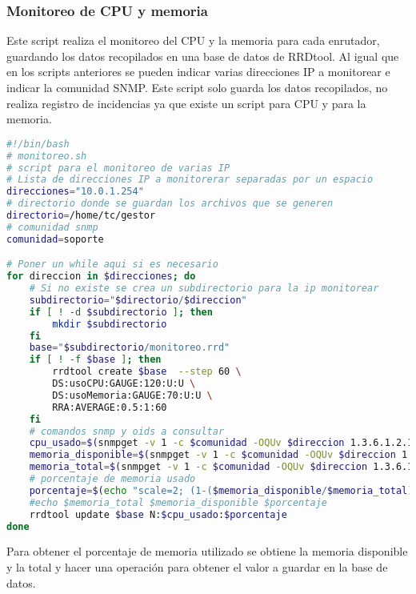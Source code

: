 \documentclass[a4paper,12pt]{article}
\begin{document}
\subsubsection{Monitoreo de CPU y memoria}
Este script realiza el monitoreo del CPU y la memoria para cada enrutador, guardando los datos recopilados en una base de datos de RRDtool. Al igual que en los scripts anteriores se pueden indicar varias direcciones IP a monitorear e indicar la comunidad SNMP. Este script solo guarda los datos recopilados, no realiza registro de incidencias ya que existe un script para CPU y para la memoria. 
\begin{lstlisting}[language=bash]
 #!/bin/bash
# monitoreo.sh
# script para el monitoreo de varias IP
# Lista de direcciones IP a monitorerar separadas por un espacio
direcciones="10.0.1.254"
# directorio donde se guardan los archivos que se generen
directorio=/home/tc/gestor
# comunidad snmp
comunidad=soporte

# Poner un while aqui si es necesario
for direccion in $direcciones; do
    # Si no existe se crea un subdirectorio para la ip monitorear
    subdirectorio="$directorio/$direccion"
    if [ ! -d $subdirectorio ]; then
        mkdir $subdirectorio
    fi
    base="$subdirectorio/monitoreo.rrd"
    if [ ! -f $base ]; then
        rrdtool create $base  --step 60 \
        DS:usoCPU:GAUGE:120:U:U \
        DS:usoMemoria:GAUGE:70:U:U \
        RRA:AVERAGE:0.5:1:60
    fi
    # comandos snmp y oids a consultar
    cpu_usado=$(snmpget -v 1 -c $comunidad -OQUv $direccion 1.3.6.1.2.1.25.3.3.1.2.768)
    memoria_disponible=$(snmpget -v 1 -c $comunidad -OQUv $direccion 1.3.6.1.4.1.2021.4.6.0)
    memoria_total=$(snmpget -v 1 -c $comunidad -OQUv $direccion 1.3.6.1.4.1.2021.4.5.0)
    # porcentaje de memoria usado
    porcentaje=$(echo "scale=2; (1-($memoria_disponible/$memoria_total))*100" | bc -l)
    #echo $memoria_total $memoria_disponible $porcentaje
    rrdtool update $base N:$cpu_usado:$porcentaje
done

\end{lstlisting}

Para obtener el porcentaje de memoria utilizado se obtiene la memoria disponible y la total y hacer una operación para obtener el valor a guardar en la base de datos.
\end{document}
